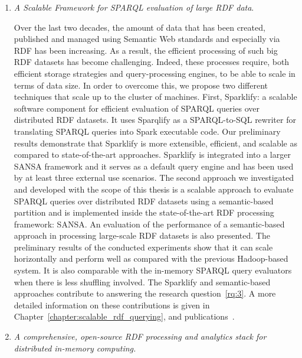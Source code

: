 \begin{enumerate}
    \item \textit{A Scalable Framework for \gls{SPARQL} evaluation of large \gls{RDF} data}.
    
    Over the last two decades, the amount of data that has been created, published and managed using Semantic Web standards and especially via \gls{RDF} has been increasing.
    As a result, the efficient processing of such big \gls{RDF} datasets has become challenging.
    Indeed, these processes require, both efficient storage strategies and query-processing engines, to be able to scale in terms of data size.
    In order to overcome this, we propose two different techniques that scale up to the cluster of machines.
    First, Sparklify: a scalable software component for efficient evaluation of \gls{SPARQL} queries over distributed \gls{RDF} datasets. It uses Sparqlify as a SPARQL-to-SQL rewriter for translating \gls{SPARQL} queries into Spark executable code.
    Our preliminary results demonstrate that Sparklify is more extensible, efficient, and scalable as compared to state-of-the-art approaches.
    Sparklify is integrated into a larger SANSA framework and it serves as a default query engine and has been used by at least three external use scenarios.
    The second approach we investigated and developed with the scope of this thesis is a scalable approach to evaluate \gls{SPARQL} queries over distributed \gls{RDF} datasets using a semantic-based partition and is implemented inside the state-of-the-art \gls{RDF} processing framework: SANSA.
    An evaluation of the performance of a semantic-based approach in processing large-scale \gls{RDF} datasets is also presented. 
    The preliminary results of the conducted experiments show that it can scale horizontally and perform well as compared with the previous Hadoop-based system.
    It is also comparable with the in-memory \gls{SPARQL} query evaluators when there is less shuffling involved.
    The Sparklify and semantic-based approaches contribute to answering the research question~\ref{rq:3}.
    A more detailed information on these contributions is given in Chapter~\ref{chapter:scalable_rdf_querying}, and publications~\cite{2019-sansa-sparklify-iswc, sejdiu-2019-sansa-semantic-based-semantics, sansa-sparklify-ISWC-demo}.
    
    \item \textit{A comprehensive, open-source \gls{RDF} processing and analytics stack for distributed in-memory computing.} 
    

\end{enumerate}
